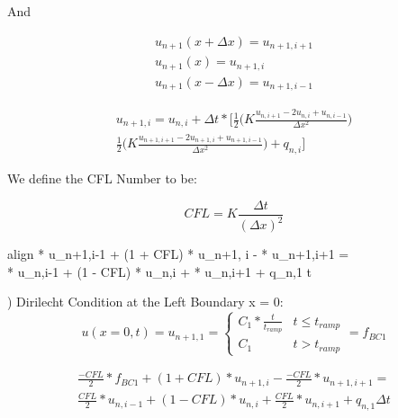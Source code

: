 \documentclass[10pt, letter, showtrims]{extarticle}
\newcommand{\boxedeq}[2]{\begin{empheq}[box={\fboxsep=6pt\fbox}]{align}\label{#1}#2\end{empheq}}
\begin{document}
		\noindent
		And
		
		\begin{equation}
			\begin{split}
				u_{n+1}(x + \Delta x) = u_{n+1,i+1} \\
				u_{n+1}(x)            = u_{n+1,i} \\
				u_{n+1}(x - \Delta x) = u_{n+1,i-1}
			\end{split}
		\end{equation}
		
		\begin{equation}
			\begin{split}
			u_{n+1,i} = u_{n,i} + \Delta t * \Big[ \frac{1}{2} \big( K \frac{u_{n,i+1} - 2 u_{n,i} + u_{n,i-1}}{\Delta x^{2}} \big) \\
			 \frac{1}{2} \big( K \frac{u_{n+1,i+1} - 2 u_{n+1,i} + u_{n+1,i-1}}{\Delta x^{2}} \big) + q_{n,i} \Big]
			\end{split}
		\end{equation}
		
		\noindent
		We define the CFL Number to be:
		
		\begin{equation}
			CFL = K \frac{\Delta t}{(\Delta x)^{2}}
		\end{equation}
		
		\boxedeq{}{ * u_{n+1,i-1} + (1 + CFL) * u_{n+1, i} - \frac{-CFL}{2} * u_{n+1,i+1} = \\ \frac{CFL}{2} * u_{n,i-1} + (1 - CFL) * u_{n,i} + \frac{CFL}{2} * u_{n,i+1} + q_{n,1} \Delta t}
		
		\pagebreak
		
		) Dirilecht Condition at the Left Boundary x = 0:	\\
		
		\begin{equation}
			u(x=0, t) = u_{n+1, 1} = \begin{cases} 
          					C_{1} * \frac{t}{t_{ramp}} & t\leq t_{ramp} \\
          					C_{1}                      & t > t_{ramp}
       					\end{cases} = f_{BC1}
    		\end{equation}  		

		\begin{equation}
			\begin{split}
			\frac{-CFL}{2} * f_{BC1} + (1 + CFL) * u_{n+1, i} - \frac{-CFL}{2} * u_{n+1,i+1} = \\ 
			\frac{CFL}{2} * u_{n,i-1} + (1 - CFL) * u_{n,i} + \frac{CFL}{2} * u_{n,i+1} + q_{n,1} \Delta t
			\end{split}
		\end{equation}
		
\end{document}
